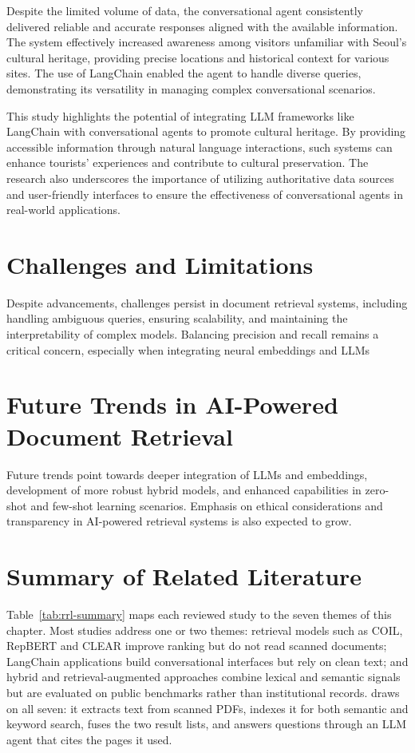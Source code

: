 Despite the limited volume of data, the conversational agent consistently delivered reliable and accurate responses aligned with the available information. The system effectively increased awareness among visitors unfamiliar with Seoul's cultural heritage, providing precise locations and historical context for various sites. The use of LangChain enabled the agent to handle diverse queries, demonstrating its versatility in managing complex conversational scenarios.

This study highlights the potential of integrating LLM frameworks like LangChain with conversational agents to promote cultural heritage. By providing accessible information through natural language interactions, such systems can enhance tourists' experiences and contribute to cultural preservation. The research also underscores the importance of utilizing authoritative data sources and user-friendly interfaces to ensure the effectiveness of conversational agents in real-world applications.

\section{Challenges and Limitations}

Despite advancements, challenges persist in document retrieval systems, including handling ambiguous queries, ensuring scalability, and maintaining the interpretability of complex models. Balancing precision and recall remains a critical concern, especially when integrating neural embeddings and LLMs

\section{Future Trends in AI-Powered Document Retrieval}

Future trends point towards deeper integration of LLMs and embeddings, development of more robust hybrid models, and enhanced capabilities in zero-shot and few-shot learning scenarios. Emphasis on ethical considerations and transparency in AI-powered retrieval systems is also expected to grow.
\section{Summary of Related Literature}\label{sec:rrl-summary}

Table~\ref{tab:rrl-summary} maps each reviewed study to the seven themes of this chapter. Most studies address one or two themes: retrieval models such as COIL, RepBERT and CLEAR improve ranking but do not read scanned documents; LangChain applications build conversational interfaces but rely on clean text; and hybrid and retrieval-augmented approaches combine lexical and semantic signals but are evaluated on public benchmarks rather than institutional records. \cs{} draws on all seven: it extracts text from scanned PDFs, indexes it for both semantic and keyword search, fuses the two result lists, and answers questions through an LLM agent that cites the pages it used.


